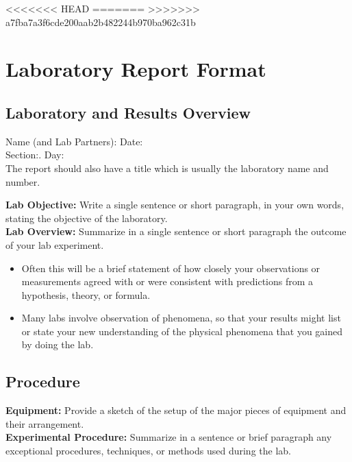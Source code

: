 <<<<<<< HEAD
=======
>>>>>>> a7fba7a3f6cde200aab2b482244b970ba962c31b

\chapter{Laboratory Report Format} \label{a:rptformat}
\section{Laboratory and Results Overview}
Name (and Lab Partners):\hspace{2.61in} Date:\\
Section:. \hspace{3.75in} Day:\\
The report should also have a title which is usually the laboratory name and number.

\noindent \textbf{Lab Objective:} Write a single sentence or short paragraph, in your own words, stating the objective of the laboratory.\\
\textbf{Lab Overview:} Summarize in a single sentence or short paragraph the outcome of your lab experiment.
\begin{itemize}[itemsep=0pt]
	\item Often this will be a brief statement of how closely your observations or measurements agreed with or were consistent with predictions from a hypothesis, theory, or formula.
	\item Many labs involve observation of phenomena, so that your results might list or state your new understanding of the physical phenomena that you gained by doing the lab.
\end{itemize}

\section{Procedure}
\textbf{Equipment:} Provide a sketch of the setup of the major pieces of equipment and their arrangement.\\
\textbf{Experimental Procedure:} Summarize in a sentence or brief paragraph any exceptional procedures, techniques, or methods used during the lab.

